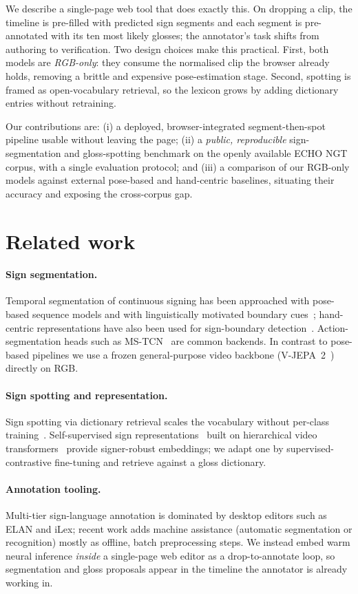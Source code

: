 \documentclass[10pt,twocolumn]{article}
\begin{document}
We describe a single-page web tool that does exactly this. On dropping a clip, the timeline is
pre-filled with predicted sign segments and each segment is pre-annotated with its ten most
likely glosses; the annotator's task shifts from authoring to verification. Two design choices
make this practical. First, both models are \emph{RGB-only}: they consume the normalised clip
the browser already holds, removing a brittle and expensive pose-estimation stage. Second,
spotting is framed as open-vocabulary retrieval, so the lexicon grows by adding dictionary
entries without retraining.

Our contributions are: (i) a deployed, browser-integrated segment-then-spot pipeline usable
without leaving the page; (ii) a \emph{public, reproducible} sign-segmentation and
gloss-spotting benchmark on the openly available ECHO NGT corpus, with a single evaluation
protocol; and (iii) a comparison of our RGB-only models against external pose-based and
hand-centric baselines, situating their accuracy and exposing the cross-corpus gap.

\section{Related work}
\paragraph{Sign segmentation.}
Temporal segmentation of continuous signing has been approached with pose-based sequence models
and with linguistically motivated boundary cues~\cite{moryossef2023}; hand-centric
representations have also been used for sign-boundary detection~\cite{handson}. Action-segmentation
heads such as MS-TCN~\cite{mstcn} are common backends. In contrast to pose-based pipelines we use
a frozen general-purpose video backbone (V-JEPA~2~\cite{vjepa2}) directly on RGB.
\paragraph{Sign spotting and representation.}
Sign spotting via dictionary retrieval scales the vocabulary without per-class
training~\cite{momeni}. Self-supervised sign representations~\cite{signrep} built on hierarchical
video transformers~\cite{hiera} provide signer-robust embeddings; we adapt one by
supervised-contrastive fine-tuning and retrieve against a gloss dictionary.
\paragraph{Annotation tooling.}
Multi-tier sign-language annotation is dominated by desktop editors such as ELAN and iLex; recent
work adds machine assistance (automatic segmentation or recognition) mostly as offline, batch
preprocessing steps. We instead embed warm neural inference \emph{inside} a single-page web editor
as a drop-to-annotate loop, so segmentation and gloss proposals appear in the timeline the
annotator is already working in.
\end{document}
